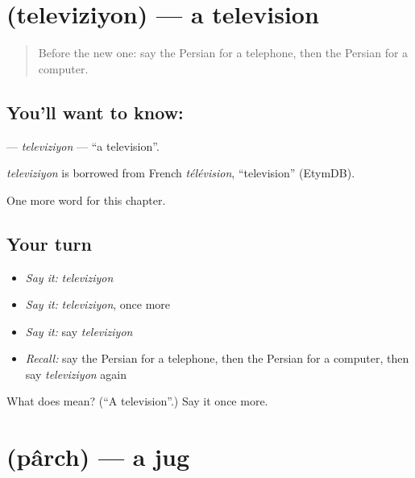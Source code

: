 \section[\texorpdfstring{\fa{تلویزیون} (televiziyon)}{تلویزیون (televiziyon)}]{ (televiziyon) — a television}

\label{lesson:FA-C110-televiziyon}



\begin{quote}
Before the new one: say the Persian for a telephone, then the Persian for a computer.
\end{quote}

\subsection*{You'll want to know: }
\textbf{} — \emph{televiziyon} — \textquotedblleft{}a television\textquotedblright{}.

\begin{cousinweb}
\emph{televiziyon} is borrowed from French \emph{télévision}, \textquotedblleft{}television\textquotedblright{} (EtymDB).
\end{cousinweb}

\begin{grammarlens}[title={What you've built}]
One more word for this chapter.
\end{grammarlens}

\subsection*{Your turn}
\begin{itemize}
\raggedright
  \item \emph{Say it:} \emph{televiziyon}
  \item \emph{Say it:} \emph{televiziyon}, once more
  \item \emph{Say it:} say \emph{televiziyon}
  \item \emph{Recall:} say the Persian for a telephone, then the Persian for a computer, then say \emph{televiziyon} again
\end{itemize}

\begin{tcolorbox}[breakable,colback=teal!4,colframe=teal!35!black,title={Before you move on}]
What does  mean? (\textquotedblleft{}A television\textquotedblright{}.) Say it once more.
\end{tcolorbox}
\section[\texorpdfstring{\fa{پارچ} (pârch)}{پارچ (pârch)}]{ (pârch) — a jug}

